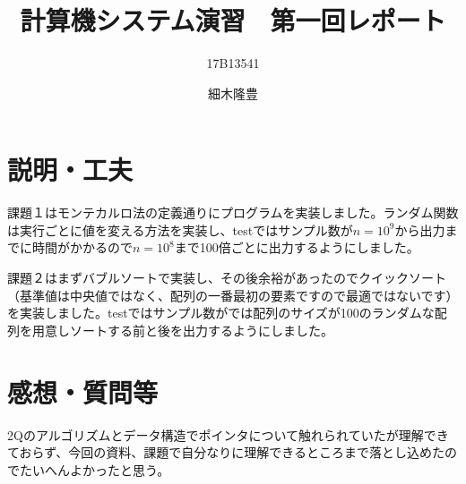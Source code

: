 \documentclass{jarticle}
\title{計算機システム演習　第一回レポート}
\author{17B13541 \and 細木隆豊}
\date{}
\begin{document}
  \maketitle

  \section{説明・工夫}
  課題１はモンテカルロ法の定義通りにプログラムを実装しました。ランダム関数は実行ごとに値を変える方法を実装し、testではサンプル数が$n=10^9$から出力までに時間がかかるので$n=10^8$まで100倍ごとに出力するようにしました。

  課題２はまずバブルソートで実装し、その後余裕があったのでクイックソート（基準値は中央値ではなく、配列の一番最初の要素ですので最適ではないです）を実装しました。testではサンプル数がでは配列のサイズが100のランダムな配列を用意しソートする前と後を出力するようにしました。
  \section{感想・質問等}
  2Qのアルゴリズムとデータ構造でポインタについて触れられていたが理解できておらず、今回の資料、課題で自分なりに理解できるところまで落とし込めたのでたいへんよかったと思う。
\end{document}
